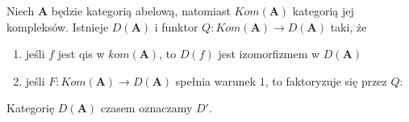 \begin{theorem}
  Niech $\mathbf{A}$ będzie kategorią abelową, natomiast $Kom(\mathbf{A})$ kategorią jej kompleksów. Istnieje  $D(\mathbf{A})$ i funktor $Q:Kom(\mathbf{A})\to D(\mathbf{A})$ taki, że 
  \begin{enumerate}
    \item jeśli $f$ jest qis w $kom(\mathbf{A})$, to $D(f)$ jest izomorfizmem w $D(\mathbf{A})$
    \item jeśli $F:Kom(\mathbf{A})\to D(\mathbf{A})$ spełnia warunek $1$, to faktoryzuje się przez $Q$:
      \begin{center}\end{center}
  \end{enumerate}

  Kategorię $D(\mathbf{A})$ czasem oznaczamy $D'$.
\end{theorem}
